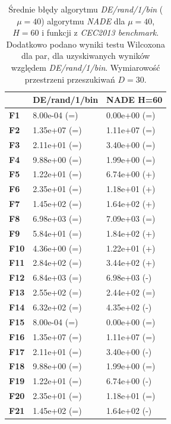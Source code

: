 \documentclass[12pt,a4paper]{report}
\begin{document}
{{{{{{\begin{table}[]
\centering
\caption{Średnie błędy algorytmu \emph{DE/rand/1/bin} ($\mu = 40$) algorytmu \emph{NADE} dla $\mu = 40$, $H = 60$ i funkcji z \emph{CEC2013 benchmark}. Dodatkowo podano wyniki testu Wilcoxona dla par, dla uzyskiwanych wyników względem \emph{DE/rand/1/bin}. Wymiarowość przestrzeni przeszukiwań $D = 30$.}
\label{Eksp3}
\begin{tabular}{|l|l|l|}
\hline
          & {\bf DE/rand/1/bin} & {\bf NADE H=60} \\ \hline
{\bf F1}  & 8.00e-04 (=)        & 0.00e+00 (=)    \\ \hline
{\bf F2}  & 1.35e+07 (=)        & 1.11e+07 (=)    \\ \hline
{\bf F3}  & 2.11e+01 (=)        & 3.40e+00 (=)    \\ \hline
{\bf F4}  & 9.88e+00 (=)        & 1.99e+00 (=)    \\ \hline
{\bf F5}  & 1.22e+01 (=)        & 6.74e+00 (+)    \\ \hline
{\bf F6}  & 2.35e+01 (=)        & 1.18e+01 (+)    \\ \hline
{\bf F7}  & 1.45e+02 (=)        & 1.64e+02 (+)    \\ \hline
{\bf F8}  & 6.98e+03 (=)        & 7.09e+03 (=)    \\ \hline
{\bf F9}  & 5.84e+01 (=)        & 1.84e+02 (+)    \\ \hline
{\bf F10} & 4.36e+00 (=)        & 1.22e+01 (+)    \\ \hline
{\bf F11} & 2.84e+02 (=)        & 3.44e+02 (+)    \\ \hline
{\bf F12} & 6.84e+03 (=)        & 6.98e+03 (-)    \\ \hline
{\bf F13} & 2.55e+02 (=)        & 2.44e+02 (=)    \\ \hline
{\bf F14} & 6.32e+02 (=)        & 4.35e+02 (-)    \\ \hline
{\bf F15} & 8.00e-04 (=)        & 0.00e+00 (=)    \\ \hline
{\bf F16} & 1.35e+07 (=)        & 1.11e+07 (=)    \\ \hline
{\bf F17} & 2.11e+01 (=)        & 3.40e+00 (-)    \\ \hline
{\bf F18} & 9.88e+00 (=)        & 1.99e+00 (=)    \\ \hline
{\bf F19} & 1.22e+01 (=)        & 6.74e+00 (-)    \\ \hline
{\bf F20} & 2.35e+01 (=)        & 1.18e+01 (=)    \\ \hline
{\bf F21} & 1.45e+02 (=)        & 1.64e+02 (-)    \\ \hline

\end{tabular}
\end{table}}}}}}}
\end{document}
